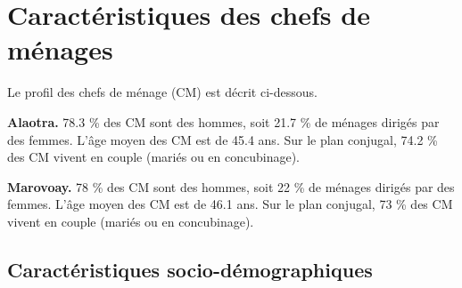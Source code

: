 \documentclass[
  french,
  letterpaper,
]{report}
\begin{document}
\section{Caractéristiques des chefs de
ménages}\label{caractuxe9ristiques-des-chefs-de-muxe9nages}

Le profil des chefs de ménage (CM) est décrit ci-dessous.

\textbf{Alaotra.} 78.3 \% des CM sont des hommes, soit 21.7 \% de
ménages dirigés par des femmes. L'âge moyen des CM est de 45.4 ans. Sur
le plan conjugal, 74.2 \% des CM vivent en couple (mariés ou en
concubinage).

\textbf{Marovoay.} 78 \% des CM sont des hommes, soit 22 \% de ménages
dirigés par des femmes. L'âge moyen des CM est de 46.1 ans. Sur le plan
conjugal, 73 \% des CM vivent en couple (mariés ou en concubinage).

\subsection{Caractéristiques
socio-démographiques}\label{caractuxe9ristiques-socio-duxe9mographiques}
\end{document}
